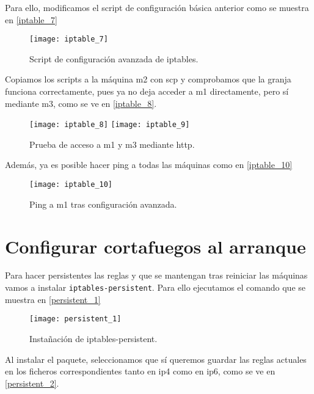 Para ello, modificamos el script de configuración básica anterior como se muestra en \eqref{iptable_7}

\begin{figure}[h!]
\begin{center}
\caption{Script de configuración avanzada de iptables.}
\label{iptable_7}
\texttt{[image: iptable\_7]}
\end{center}
\end{figure}

Copiamos los scripts a la máquina m2 con scp y comprobamos que la granja funciona correctamente, pues ya no deja acceder a m1 directamente, pero sí mediante m3, como se ve en \eqref{iptable_8}.

\begin{figure}[h!]
\begin{center}
\caption{Prueba de acceso a m1 y m3 mediante http.}
\label{iptable_8}
\texttt{[image: iptable\_8]}
\texttt{[image: iptable\_9]}
\end{center}
\end{figure}

Además, ya es posible hacer ping a todas las máquinas como en \eqref{iptable_10}

\begin{figure}[h!]
\begin{center}
\caption{Ping a m1 tras configuración avanzada.}
\label{iptable_10}
\texttt{[image: iptable\_10]}
\end{center}
\end{figure}



\chapter{Configurar cortafuegos al arranque}

Para hacer persistentes las reglas y que se mantengan tras reiniciar las máquinas vamos a instalar \verb|iptables-persistent|. Para ello ejecutamos el comando que se muestra en \eqref{persistent_1}

\begin{figure}[h!]
\begin{center}
\caption{Instañación de iptables-persistent.}
\label{persistent_1}
\texttt{[image: persistent\_1]}
\end{center}
\end{figure}

Al instalar el paquete, seleccionamos que sí queremos guardar las reglas actuales en los ficheros correspondientes tanto en ip4 como en ip6, como se ve en \eqref{persistent_2}.


